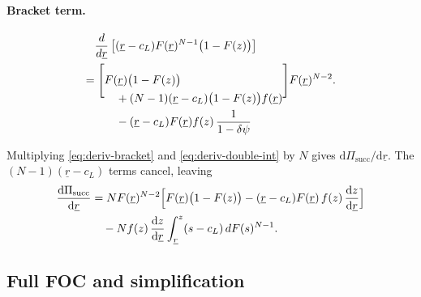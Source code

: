 \paragraph{Bracket term.}
\begin{align}
  &\frac{d}{d\underline{r}}
    \left[
      (\underline{r} - c_L) F(\underline{r})^{N-1}
        \bigl(1 - F(z)\bigr)
    \right]
  \notag\\
  =&\; \Biggl[
    \begin{aligned}[t]
      &F(\underline{r})\bigl(1 - F(z)\bigr) \\
      &\quad + (N-1)(\underline{r} - c_L)
        \bigl(1 - F(z)\bigr) f(\underline{r}) \\
      &\quad - (\underline{r} - c_L) F(\underline{r})
        f(z)\,
        \frac{1}{1 - \delta \psi}
    \end{aligned}
  \Biggr]
  F(\underline{r})^{N-2}.
  \label{eq:deriv-bracket}
\end{align}

Multiplying \eqref{eq:deriv-bracket} and \eqref{eq:deriv-double-int} by $N$
gives $\mathrm d\Pi_{\text{succ}}/\mathrm d\underline{r}$.
The $(N-1)(\underline{r}-c_L)$ terms cancel, leaving
\begin{align}
  \frac{\mathrm d\Pi_{\text{succ}}}{\mathrm d\underline{r}}
  &= N F(\underline{r})^{N-2}
    \Bigl[
      F(\underline{r})\bigl(1 - F(z)\bigr)
      - (\underline{r} - c_L) F(\underline{r})\,
        f(z)\,
        \frac{\mathrm dz}{\mathrm d\underline{r}}
    \Bigr]
  \notag\\
  &\quad - N f(z)\,
    \frac{\mathrm dz}{\mathrm d\underline{r}}
    \int_{\underline{r}}^{z}
      (s - c_L)\, dF(s)^{N-1}.
  \label{eq:deriv-succ-collapsed}
\end{align}

\subsection{Full FOC and simplification}
\label{subsec:foc-full}

